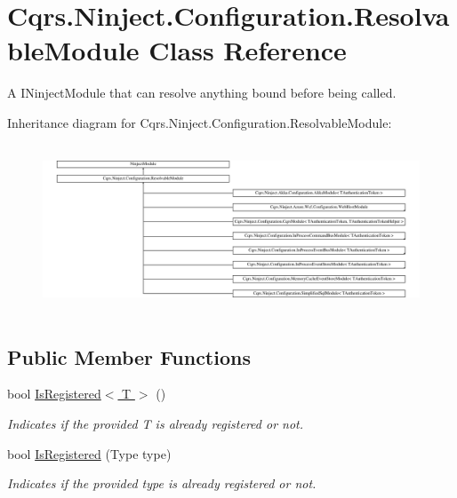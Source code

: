 \hypertarget{classCqrs_1_1Ninject_1_1Configuration_1_1ResolvableModule}{}\section{Cqrs.\+Ninject.\+Configuration.\+Resolvable\+Module Class Reference}
\label{classCqrs_1_1Ninject_1_1Configuration_1_1ResolvableModule}


A I\+Ninject\+Module that can resolve anything bound before being called.  


Inheritance diagram for Cqrs.\+Ninject.\+Configuration.\+Resolvable\+Module\+:\begin{figure}[H]
\begin{center}
\leavevmode
\includegraphics[height=5.054152cm]{classCqrs_1_1Ninject_1_1Configuration_1_1ResolvableModule}
\end{center}
\end{figure}
\subsection*{Public Member Functions}
\begin{DoxyCompactItemize}
\item 
bool \hyperlink{classCqrs_1_1Ninject_1_1Configuration_1_1ResolvableModule_a622339cf7b08ce97d23c9b2f00cedea3_a622339cf7b08ce97d23c9b2f00cedea3}{Is\+Registered$<$ T $>$} ()
\begin{DoxyCompactList}\small\item\em Indicates if the provided {\itshape T}  is already registered or not. \end{DoxyCompactList}\item 
bool \hyperlink{classCqrs_1_1Ninject_1_1Configuration_1_1ResolvableModule_ae5b77cb7b9b0b826a603fea25609a1ac_ae5b77cb7b9b0b826a603fea25609a1ac}{Is\+Registered} (Type type)
\begin{DoxyCompactList}\small\item\em Indicates if the provided {\itshape type}  is already registered or not. \end{DoxyCompactList}\end{DoxyCompactItemize}
